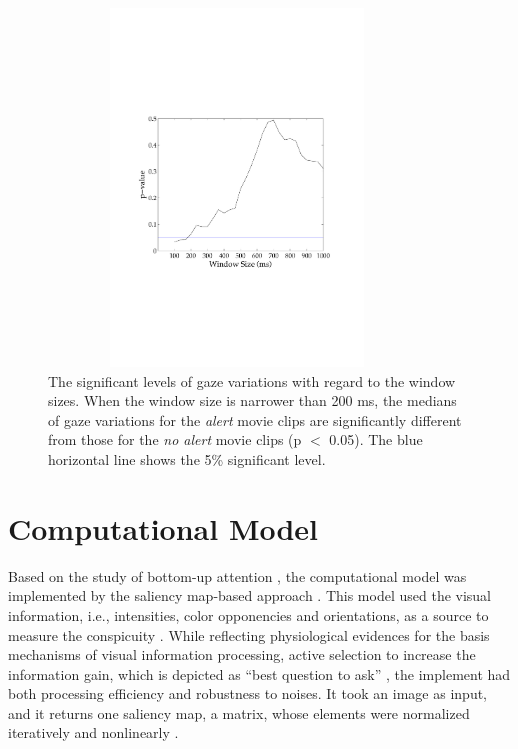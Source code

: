 \documentclass[oneside,master]{snueethesis}
\begin{document}
\begin{figure}
  \centerline{\includegraphics[width=100mm,height=95mm,trim=28mm 75mm 28mm 76mm]{./eps/gaze_var.pdf}}
  \caption[The significant levels of gaze variations with regard to the window sizes]{The significant levels of gaze variations with regard to the window sizes. When the window size is narrower than 200 ms, the medians of gaze variations for the \textit{alert} movie clips are significantly different from those for the \textit{no alert} movie clips (p $<$ 0.05). The blue horizontal line shows the 5\% significant level.}
  \label{fig:gaze-variation}
\end{figure}


\section{Computational Model}

Based on the study of bottom-up attention \cite{koch1985shifts}, the computational model was implemented by the saliency map-based approach \cite{itti1998model}. This model used the visual information, i.e., intensities, color opponencies and orientations, as a source to measure the conspicuity \cite{Parkhurst2002}. While reflecting physiological evidences for the basis mechanisms of visual information processing, active selection to increase the information gain, which is depicted as ``best question to ask'' \cite{Reinagel1999,zetzsche1998investigation}, the implement had both processing efficiency and robustness to noises. It took an image as input, and it returns one saliency map, a matrix, whose elements were normalized iteratively and nonlinearly \cite{itti2000saliency}.
\end{document}
